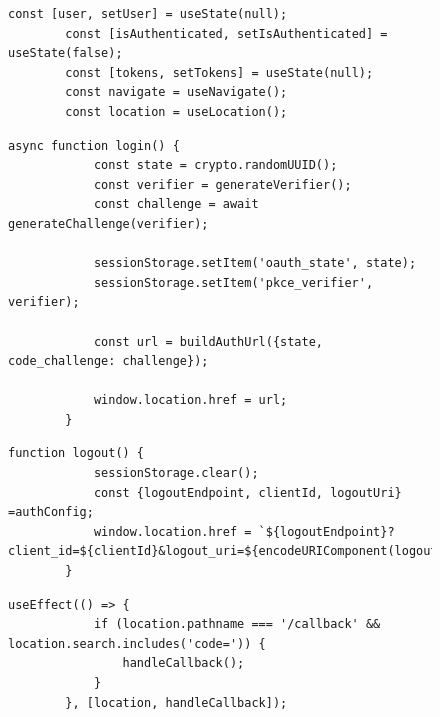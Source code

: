\begin{figure}[H]
    \begin{lstlisting}[caption=Variablen für den Authentifizierungs-Kontext, breaklines = true, label=list:authcontextvariables]
        const [user, setUser] = useState(null);
        const [isAuthenticated, setIsAuthenticated] = useState(false);
        const [tokens, setTokens] = useState(null);
        const navigate = useNavigate();
        const location = useLocation();
    \end{lstlisting}
\end{figure}

\begin{figure}[H]
    \begin{lstlisting}[caption=Login-Methode, breaklines = true, label=list:authcontextlogin]
        async function login() {
            const state = crypto.randomUUID();
            const verifier = generateVerifier();
            const challenge = await generateChallenge(verifier);

            sessionStorage.setItem('oauth_state', state);
            sessionStorage.setItem('pkce_verifier', verifier);
            
            const url = buildAuthUrl({state, code_challenge: challenge});

            window.location.href = url;
        }
\end{lstlisting}
\end{figure}

\begin{figure}[H]
    \begin{lstlisting}[caption=Logout-Methode, breaklines = true, label=list:authcontextlogout]
        function logout() {
            sessionStorage.clear();
            const {logoutEndpoint, clientId, logoutUri} =authConfig;
            window.location.href = `${logoutEndpoint}?client_id=${clientId}&logout_uri=${encodeURIComponent(logoutUri)}`; 
        }
    \end{lstlisting}
\end{figure}

\begin{figure}[H]
    \begin{lstlisting}[caption=Callback-Handling, breaklines = true, label=list:authcontextcallback]
        useEffect(() => {
            if (location.pathname === '/callback' && location.search.includes('code=')) {
                handleCallback();
            }
        }, [location, handleCallback]);
\end{lstlisting}
\end{figure}

